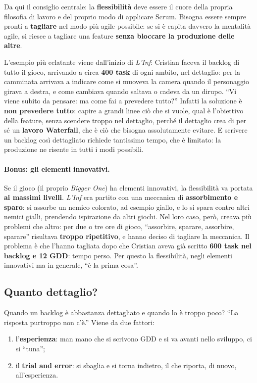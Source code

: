 Da qui il consiglio centrale: la \textbf{flessibilità} deve essere il cuore
della propria filosofia di lavoro e del proprio modo di applicare Scrum.
Bisogna essere sempre pronti a \textbf{tagliare} nel modo più agile possibile:
se si è capita davvero la mentalità agile, si riesce a tagliare una feature
\textbf{senza bloccare la produzione delle altre}.

L'esempio più eclatante viene dall'inizio di \emph{L'Inf}: Cristian faceva il
backlog di tutto il gioco, arrivando a circa \textbf{400 task} di ogni ambito,
nel dettaglio: per la camminata arrivava a indicare come si muoveva la camera
quando il personaggio girava a destra, e come cambiava quando saltava o cadeva
da un dirupo. ``Vi viene subito da pensare: ma come fai a prevedere tutto?''
Infatti la soluzione è \textbf{non prevedere tutto}: capire a grandi linee ciò
che si vuole, qual è l'obiettivo della feature, senza scendere troppo nel
dettaglio, perché il dettaglio crea di per sé un \textbf{lavoro Waterfall}, che
è ciò che bisogna assolutamente evitare. E scrivere un backlog così dettagliato
richiede tantissimo tempo, che è limitato: la produzione ne risente in tutti i
modi possibili.

\paragraph{Bonus: gli elementi innovativi.} Se il gioco (il proprio
\emph{Bigger One}) ha elementi innovativi, la flessibilità va portata
\textbf{ai massimi livelli}. \emph{L'Inf} era partito con una meccanica di
\textbf{assorbimento e sparo}: si assorbe un nemico colorato, ad esempio
giallo, e lo si spara contro altri nemici gialli, prendendo ispirazione da
altri giochi. Nel loro caso, però, creava più problemi che altro: per due o
tre ore di gioco, ``assorbire, sparare, assorbire, sparare'' risultava
\textbf{troppo ripetitivo}, e hanno deciso di tagliare la meccanica. Il
problema è che l'hanno tagliata dopo che Cristian aveva già scritto
\textbf{600 task nel backlog e 12 GDD}: tempo perso. Per questo la
flessibilità, negli elementi innovativi ma in generale, ``è la prima cosa''.

\subsection{Quanto dettaglio?}

Quando un backlog è abbastanza dettagliato e quando lo è troppo poco?
``La risposta purtroppo non c'è.'' Viene da due fattori:
\begin{enumerate}
  \item l'\textbf{esperienza}: man mano che si scrivono GDD e si va avanti
        nello sviluppo, ci si ``tuna'';
  \item il \textbf{trial and error}: si sbaglia e si torna indietro, il che
        riporta, di nuovo, all'esperienza.
\end{enumerate}

